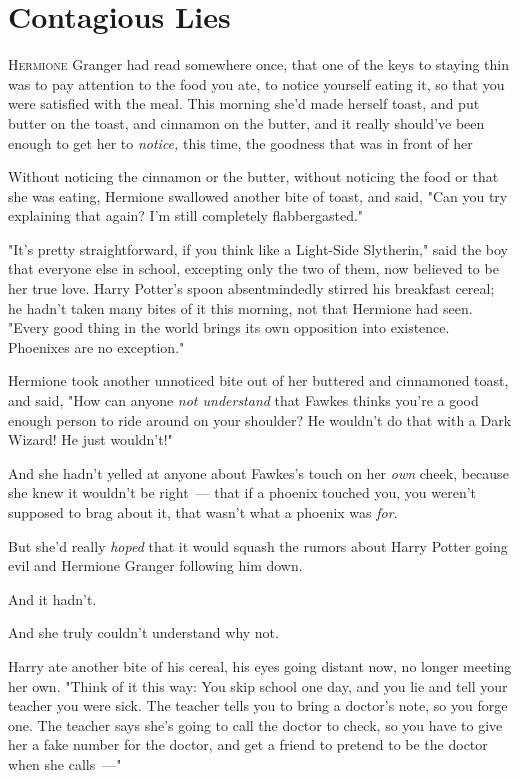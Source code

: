 \chapter{Contagious Lies}

\lettrine{H}{ermione} Granger
had read somewhere once, that one of the keys to staying thin was to pay
attention to the food you ate, to notice yourself eating it, so that you were
satisfied with the meal. This morning she'd made herself toast, and put butter
on the toast, and cinnamon on the butter, and it really should've been enough
to get her to \emph{notice,} this time, the goodness that was in front of
her{\el}

Without noticing the cinnamon or the butter, without noticing the food or that
she was eating, Hermione swallowed another bite of toast, and said, "Can you
try explaining that again? I'm still completely flabbergasted."

"It's pretty straightforward, if you think like a Light-Side Slytherin," said
the boy that everyone else in school, excepting only the two of them, now
believed to be her true love. Harry Potter's spoon absentmindedly stirred his
breakfast cereal; he hadn't taken many bites of it this morning, not that
Hermione had seen. "Every good thing in the world brings its own opposition
into existence. Phoenixes are no exception."

Hermione took another unnoticed bite out of her buttered and cinnamoned toast,
and said, "How can anyone \emph{not understand} that Fawkes thinks you're a
good enough person to ride around on your shoulder? He wouldn't do that with a
Dark Wizard! He just wouldn't!"

And she hadn't yelled at anyone about Fawkes's touch on her \emph{own} cheek,
because she knew it wouldn't be right~--- that if a phoenix touched you, you
weren't supposed to brag about it, that wasn't what a phoenix was \emph{for}.

But she'd really \emph{hoped} that it would squash the rumors about Harry
Potter going evil and Hermione Granger following him down.

And it hadn't.

And she truly couldn't understand why not.

Harry ate another bite of his cereal, his eyes going distant now, no longer
meeting her own. "Think of it this way: You skip school one day, and you lie
and tell your teacher you were sick. The teacher tells you to bring a doctor's
note, so you forge one. The teacher says she's going to call the doctor to
check, so you have to give her a fake number for the doctor, and get a friend
to pretend to be the doctor when she calls~---"

